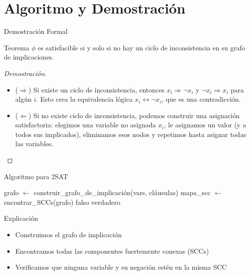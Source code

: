 \documentclass{beamer}
\begin{document}
\section{Algoritmo y Demostración}
\begin{frame}{Demostración Formal}
\begin{block}{Teorema}
$\phi$ es satisfacible si y solo si no hay un ciclo de inconsistencia en su grafo de implicaciones.
\end{block}

\begin{proof}[Demostración]
\begin{itemize}
\item \alert{($\Rightarrow$)} Si existe un ciclo de inconsistencia, entonces $x_i \Rightarrow \neg x_i$ y $\neg x_i \Rightarrow x_i$ para algún $i$. Esto crea la equivalencia lógica $x_i \leftrightarrow \neg x_i$, que es una contradicción.

\item \alert{($\Leftarrow$)} Si no existe ciclo de inconsistencia, podemos construir una asignación satisfactoria: elegimos una variable no asignada $x_i$, le asignamos un valor (y a todos sus implicados), eliminamos esos nodos y repetimos hasta asignar todas las variables.
\end{itemize}
\end{proof}
\end{frame}

\begin{frame}{Algoritmo para 2SAT}
\begin{algorithm}[H]
\caption{2SAT (vars, cláusulas)}
\begin{algorithmic}[1]
\State grafo $\gets$ construir\_grafo\_de\_implicación(vars, cláusulas)
\State mapa\_scc $\gets$ encontrar\_SCCs(grafo)
        \State \Return falso
    \EndIf
\EndFor
\State \Return verdadero
\end{algorithmic}
\end{algorithm}

\begin{block}{Explicación}
\begin{itemize}
\item Construimos el grafo de implicación
\item Encontramos todas las componentes fuertemente conexas (SCCs)
\item Verificamos que ninguna variable y su negación estén en la misma SCC
\end{itemize}
\end{block}
\end{frame}
\end{document}
